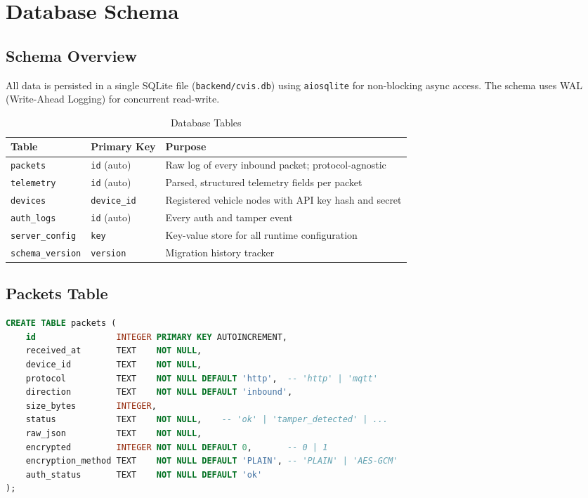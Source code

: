\documentclass[12pt,a4paper]{report}
\begin{document}
\chapter{Database Schema}


\section{Schema Overview}

All data is persisted in a single SQLite file (\texttt{backend/cvis.db}) using \texttt{aiosqlite} for non-blocking async access. The schema uses WAL (Write-Ahead Logging) for concurrent read-write.

\begin{table}[H]
\centering
\caption{Database Tables}
\label{tab:db}
\begin{tabularx}{\textwidth}{L{3cm} L{3cm} X}
\toprule
\textbf{Table} & \textbf{Primary Key} & \textbf{Purpose} \\
\midrule
\texttt{packets} & \texttt{id} (auto) & Raw log of every inbound packet; protocol-agnostic \\
\texttt{telemetry} & \texttt{id} (auto) & Parsed, structured telemetry fields per packet \\
\texttt{devices} & \texttt{device\_id} & Registered vehicle nodes with API key hash and secret \\
\texttt{auth\_logs} & \texttt{id} (auto) & Every auth and tamper event \\
\texttt{server\_config} & \texttt{key} & Key-value store for all runtime configuration \\
\texttt{schema\_version} & \texttt{version} & Migration history tracker \\
\bottomrule
\end{tabularx}
\end{table}

\section{Packets Table}

\begin{lstlisting}[language=SQL, caption=Packets Table DDL]
CREATE TABLE packets (
    id                INTEGER PRIMARY KEY AUTOINCREMENT,
    received_at       TEXT    NOT NULL,
    device_id         TEXT    NOT NULL,
    protocol          TEXT    NOT NULL DEFAULT 'http',  -- 'http' | 'mqtt'
    direction         TEXT    NOT NULL DEFAULT 'inbound',
    size_bytes        INTEGER,
    status            TEXT    NOT NULL,    -- 'ok' | 'tamper_detected' | ...
    raw_json          TEXT    NOT NULL,
    encrypted         INTEGER NOT NULL DEFAULT 0,       -- 0 | 1
    encryption_method TEXT    NOT NULL DEFAULT 'PLAIN', -- 'PLAIN' | 'AES-GCM'
    auth_status       TEXT    NOT NULL DEFAULT 'ok'
);
\end{lstlisting}
\end{document}
